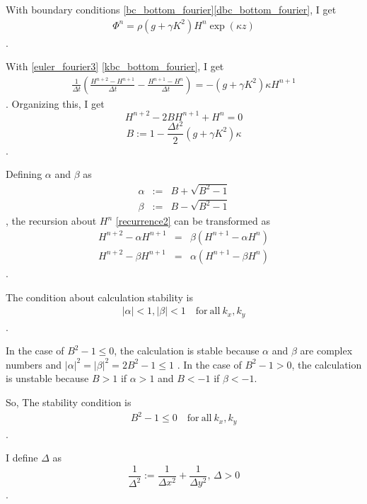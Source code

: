 \documentclass[a4paper,11pt]{article}
\begin{document}
With boundary conditions \eqref{bc_bottom_fourier}\eqref{dbc_bottom_fourier}, I get
\begin{eqnarray}
\Phi^n = \rho(g+\gamma K^2)H^n \exp (\kappa z)
\end{eqnarray}
.

With \eqref{euler_fourier3} \eqref{kbc_bottom_fourier}, I get
\begin{eqnarray}
\frac{1}{\Delta t}\left(\frac{H^{n+2} - H^{n+1}}{\Delta t}
 - \frac{H^{n+1} - H^{n}}{\Delta t}\right) = -(g+\gamma K^2)\kappa H^{n+1}
\end{eqnarray}
. Organizing this, I get
\begin{equation}
H^{n+2} - 2BH^{n+1} + H^{n} = 0 \label{recurrence2}
\end{equation}
\begin{equation}
B := 1 - \frac{\Delta t^2}{2}\left(g + \gamma K^2 \right)\kappa
\end{equation}
.

Defining $\alpha$ and $\beta$ as
\begin{eqnarray}
\alpha &:=& B + \sqrt{B^2-1} \label{solution_alpha}\\
\beta  &:=& B - \sqrt{B^2-1} \label{solution_beta}
\end{eqnarray}
, the recursion about $H^n$ \eqref{recurrence2} can be transformed as
\begin{eqnarray}
H^{n+2} - \alpha H^{n+1} &=& \beta  (H^{n+1} - \alpha H^{n}) \\
H^{n+2} - \beta  H^{n+1} &=& \alpha (H^{n+1} - \beta  H^{n})
\end{eqnarray}
.

The condition about calculation stability is 
\begin{eqnarray}
|\alpha| < 1, |\beta| < 1 
\quad\mathrm{for}\ \mathrm{all}\ k_x, k_y
\end{eqnarray}
.

In the case of $B^2 - 1 \leq 0$, the calculation is stable because $\alpha$ and $\beta$ are complex numbers and
$
|\alpha|^2 = |\beta|^2 = 2B^2 - 1 \leq 1
$
.
In the case of $B^2 - 1 > 0$, the calculation is unstable because
$B > 1$ if $\alpha > 1$ and $B < -1$ if $\beta < -1$.

So, The stability condition is 
\begin{eqnarray}
B^2 - 1 \leq 0
\quad\mathrm{for}\ \mathrm{all}\ k_x, k_y \label{stability_cond}
\end{eqnarray}
.

I define $\Delta$ as
\begin{equation}
\frac{1}{\Delta^2} := \frac{1}{\Delta x^2} + \frac{1}{\Delta y^2}, \, \Delta
 > 0
\end{equation}
. 
\end{document}
